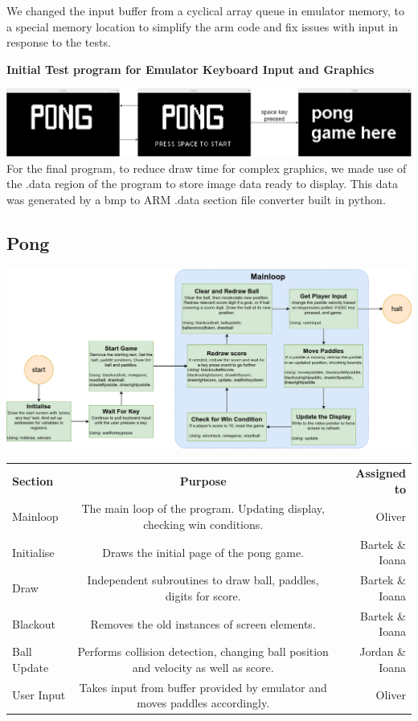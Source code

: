 \documentclass[11pt]{article}
\begin{document}
We changed the input buffer from a cyclical array queue in emulator memory, to a special memory location to simplify the arm code and fix issues with input in response to the tests.
\centerline{\textbf{Initial Test program for Emulator Keyboard Input and Graphics}}
\includegraphics[width = \textwidth]{emulator testing PONG program}
For the final program, to reduce draw time for complex graphics, we made use of the .data region of the program to store image data ready to display. This data was generated by a bmp to ARM .data section file converter built in python.
\subsection*{Pong}
\begin{center}
	\includegraphics[scale = 0.4]{pong game structure}\\
\end{center}
\begin{center}
	\begin{tabular}{l|c|r}
		\textbf{Section} & \textbf{Purpose} & \textbf{Assigned to}\\
		Mainloop & The main loop of the program. Updating display, checking win conditions. & Oliver\\
		Initialise & Draws the initial page of the pong game. & Bartek \& Ioana\\
		Draw & Independent subroutines to draw ball, paddles, digits for score. & Bartek \& Ioana\\
		Blackout & Removes the old instances of screen elements. & Bartek \& Ioana\\
		Ball Update & Performs collision detection, changing ball position and velocity as well as score. & Jordan \& Ioana\\
		User Input & Takes input from buffer provided by emulator and moves paddles accordingly. & Oliver \\
	\end{tabular}
\end{center}
\end{document}
